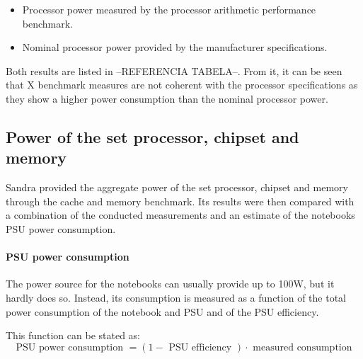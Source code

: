         \begin{itemize}
            \item Processor power measured by the processor arithmetic performance benchmark.
            \item Nominal processor power provided by the manufacturer specifications.
        \end{itemize}
        
        Both results are listed in --REFERENCIA TABELA--. From it, it can be seen that X benchmark measures are not coherent with the processor specifications as they show a higher power consumption than the nominal processor power.
        
    \subsection{Power of the set processor, chipset and  memory} \label{sec4:processor_power}
        
        Sandra provided the aggregate power of the set processor, chipset and memory through the cache and memory benchmark. Its results were then compared with a combination of the conducted measurements and an estimate of the notebooks PSU power consumption.
        
        \paragraph*{PSU power consumption}
            
            The power source for the notebooks can usually provide up to 100W, but it hardly does so. Instead, its consumption is measured as a function of the total power consumption of the notebook and PSU and of the PSU efficiency.
            
            This function can be stated as:
            \begin{equation}
                \text{ PSU power consumption } = (1 - \text{ PSU efficiency }) \cdot \text{ measured consumption }
                \label{psu_consumption}
            \end{equation}

        \paragraph*{}

